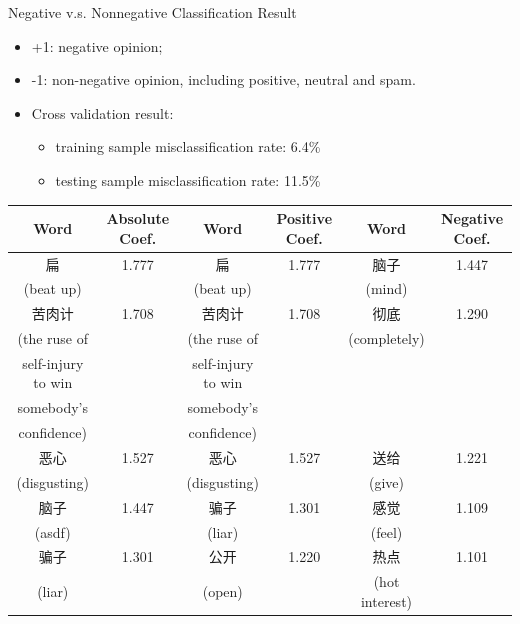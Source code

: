 \documentclass[12pt]{beamer}
\newcommand{\1}[1]{{\mathbf 1}\left\{#1\right\}}        %
\begin{document}
\begin{frame}{Negative v.s. Nonnegative Classification Result}
\begin{itemize}[<+->]
\item +1: negative opinion;
\item -1: non-negative opinion, including positive, neutral and spam.
\item Cross validation result: 
  \begin{itemize}[<+->]
  \item training sample misclassification rate: 6.4\%
  \item testing sample misclassification rate: 11.5\%
  \end{itemize}

\end{itemize}

\tiny
\begin{tabular}{|c|c||c|c||c|c|}
\hline
Word & Absolute Coef. & Word & Positive Coef. & Word & Negative Coef.\\ \hline  \hline
扁 & 1.777 & 扁 & 1.777 & 脑子 & 1.447\\
(beat up) & & (beat up) & & (mind) & \\\hline
苦肉计 & 1.708 & 苦肉计 & 1.708 & 彻底 & 1.290\\
(the ruse of  & & (the ruse of  &  &  (completely) &  \\
self-injury to win & &  self-injury to win &  & &  \\
somebody's & & somebody's  &  & &  \\
 confidence) & &  confidence)  &  & &  \\\hline
恶心 & 1.527 & 恶心 & 1.527 & 送给 & 1.221\\
(disgusting) & & (disgusting) & & (give) & \\\hline
脑子 & 1.447 & 骗子 & 1.301 & 感觉 & 1.109\\
(asdf) & & (liar) & & (feel) & \\\hline
骗子 & 1.301 & 公开 & 1.220 & 热点 & 1.101\\
(liar) & & (open) & & (hot interest) & \\\hline
\end{tabular}

\end{frame}
\end{document}
